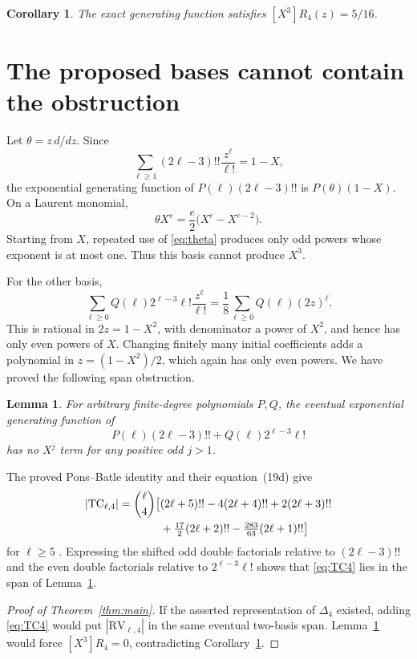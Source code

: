 \documentclass[11pt]{amsart}
\newtheorem{lemma}[theorem]{Lemma}
\newtheorem{corollary}[theorem]{Corollary}
\theoremstyle{definition}
\newcommand{\RV}{\mathrm{RV}}
\newcommand{\TC}{\mathrm{TC}}
\begin{document}
\begin{corollary}\label{cor:x3}
The exact generating function satisfies $[X^3]R_4(z)=5/16$.
\end{corollary}

\section{The proposed bases cannot contain the obstruction}

Let $\theta=z\,d/dz$.  Since
\[
 \sum_{\ell\ge1}(2\ell-3)!!\frac{z^\ell}{\ell!}=1-X,
\]
the exponential generating function of
$P(\ell)(2\ell-3)!!$ is $P(\theta)(1-X)$.  On a Laurent monomial,
\begin{equation}\label{eq:theta}
 \theta X^e=\frac e2\bigl(X^e-X^{e-2}\bigr).
\end{equation}
Starting from $X$, repeated use of \eqref{eq:theta} produces only odd powers
whose exponent is at most one.  Thus this basis cannot produce $X^3$.

For the other basis,
\[
 \sum_{\ell\ge0}Q(\ell)2^{\ell-3}\ell!\frac{z^\ell}{\ell!}
 =\frac18\sum_{\ell\ge0}Q(\ell)(2z)^\ell.
\]
This is rational in $2z=1-X^2$, with denominator a power of $X^2$, and hence
has only even powers of $X$.  Changing finitely many initial coefficients adds
a polynomial in $z=(1-X^2)/2$, which again has only even powers.  We have
proved the following span obstruction.

\begin{lemma}\label{lem:span}
For arbitrary finite-degree polynomials $P,Q$, the eventual exponential
generating function of
\[
 P(\ell)(2\ell-3)!!+Q(\ell)2^{\ell-3}\ell!
\]
has no $X^j$ term for any positive odd $j>1$.
\end{lemma}

The proved Pons--Batle identity and their equation~(19d) give
\begin{align}\label{eq:TC4}
|\TC_{\ell,4}|=\binom\ell4\bigl[&(2\ell+5)!!-4(2\ell+4)!!
+2(2\ell+3)!!\notag\\
&+\tfrac{17}{2}(2\ell+2)!!-\tfrac{283}{63}(2\ell+1)!!\bigr]
\end{align}
for $\ell\ge5$ \cite{PonsBatle2021,LinEtAl2026}.  Expressing the shifted odd
double factorials relative to $(2\ell-3)!!$ and the even double factorials
relative to $2^{\ell-3}\ell!$ shows that \eqref{eq:TC4} lies in the span of
Lemma~\ref{lem:span}.

\begin{proof}[Proof of Theorem~\ref{thm:main}]
If the asserted representation of $\Delta_4$ existed, adding
\eqref{eq:TC4} would put $|\RV_{\ell,4}|$ in the same eventual two-basis span.
Lemma~\ref{lem:span} would force $[X^3]R_4=0$, contradicting
Corollary~\ref{cor:x3}.
\end{proof}
\end{document}
